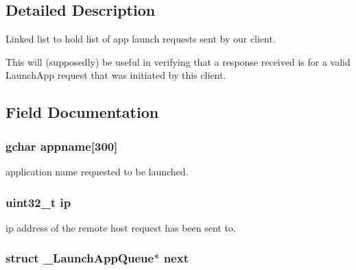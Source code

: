 \subsection{\-Detailed \-Description}
\-Linked list to hold list of app launch requests sent by our client. 

\-This will (supposedly) be useful in verifying that a response received is for a valid \-Launch\-App request that was initiated by this client. 

\subsection{\-Field \-Documentation}
\hypertarget{struct___launch_app_queue_af8cf62147ff95b08bd4b2d5200c73640}{
\subsubsection[{appname}]{\setlength{\rightskip}{0pt plus 5cm}gchar {\bf appname}\mbox{[}300\mbox{]}}}\label{struct___launch_app_queue_af8cf62147ff95b08bd4b2d5200c73640}


application name requested to be launched. 

\hypertarget{struct___launch_app_queue_a69ddb9c845da426f636d9dd0dbed4e7e}{
\subsubsection[{ip}]{\setlength{\rightskip}{0pt plus 5cm}uint32\-\_\-t {\bf ip}}}\label{struct___launch_app_queue_a69ddb9c845da426f636d9dd0dbed4e7e}


ip address of the remote host request has been sent to. 

\hypertarget{struct___launch_app_queue_a35e0e803873d619d27995e4ddae06229}{
\subsubsection[{next}]{\setlength{\rightskip}{0pt plus 5cm}struct {\bf \-\_\-\-Launch\-App\-Queue}$\ast$ {\bf next}}}\label{struct___launch_app_queue_a35e0e803873d619d27995e4ddae06229}



